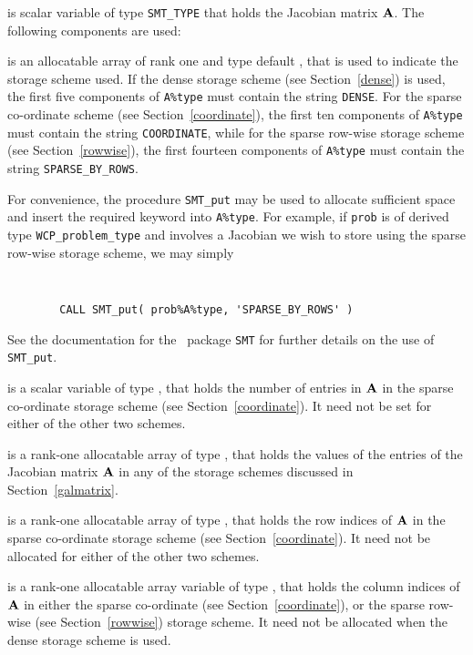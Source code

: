 \documentclass{galahad}
\newcommand{\packagename}{WCP}
\begin{document}
\begin{description}
 is scalar variable of type {\tt SMT\_TYPE} 
that holds the Jacobian matrix ${\mathbf{A}}$. The following components are used:

\begin{description}

 is an allocatable array of rank one and type default \character, that
is used to indicate the storage scheme used. If the dense storage scheme 
(see Section~\ref{dense}) is used, 
the first five components of {\tt A\%type} must contain the
string {\tt DENSE}.
For the sparse co-ordinate scheme (see Section~\ref{coordinate}), 
the first ten components of {\tt A\%type} must contain the
string {\tt COORDINATE}, while 
for the sparse row-wise storage scheme (see Section~\ref{rowwise}),
the first fourteen components of {\tt A\%type} must contain the
string {\tt SPARSE\_BY\_ROWS}.

For convenience, the procedure {\tt SMT\_put} 
may be used to allocate sufficient space and insert the required keyword
into {\tt A\%type}.
For example, if {\tt prob} is of derived type {\tt \packagename\_problem\_type}
and involves a Jacobian we wish to store using the sparse row-wise 
storage scheme, we may simply
{\tt 
\begin{verbatim}
        CALL SMT_put( prob%A%type, 'SPARSE_BY_ROWS' )
\end{verbatim}
}
\noindent
See the documentation for the \galahad\ package {\tt SMT} 
for further details on the use of {\tt SMT\_put}.

 is a scalar variable of type \integer, that 
holds the number of entries in ${\mathbf{A}}$
in the sparse co-ordinate storage scheme (see Section~\ref{coordinate}). 
It need not be set for either of the other two schemes.

 is a rank-one allocatable array of type \realdp, that holds
the values of the entries of the Jacobian matrix ${\mathbf{A}}$ in any of the 
storage schemes discussed in Section~\ref{galmatrix}.

 is a rank-one allocatable array of type \integer,
that holds the row indices of ${\mathbf{A}}$ in the sparse co-ordinate storage
scheme (see Section~\ref{coordinate}). 
It need not be allocated for either of the other two schemes.

 is a rank-one allocatable array variable of type \integer,
that holds the column indices of ${\mathbf{A}}$ in either the sparse co-ordinate 
(see Section~\ref{coordinate}), or the sparse row-wise 
(see Section~\ref{rowwise}) storage scheme.
It need not be allocated when the dense storage scheme is used.


\end{description}
\end{description}
\end{document}

